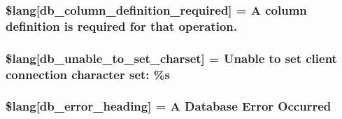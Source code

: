 \subsubsection[{\$lang}]{\setlength{\rightskip}{0pt plus 5cm}\$lang\mbox{[}\textquotesingle{}db\+\_\+column\+\_\+definition\+\_\+required\textquotesingle{}\mbox{]} = \textquotesingle{}A column definition is required {\bf for} that operation.\textquotesingle{}}\label{db__lang_8php_ad0ba270704ec81f8f89e486a18660354}
\hypertarget{db__lang_8php_ab22396948e25460833329cb8786ad831}{}
\subsubsection[{\$lang}]{\setlength{\rightskip}{0pt plus 5cm}\$lang\mbox{[}\textquotesingle{}db\+\_\+unable\+\_\+to\+\_\+set\+\_\+charset\textquotesingle{}\mbox{]} = \textquotesingle{}Unable to set client connection character set\+: \%s\textquotesingle{}}\label{db__lang_8php_ab22396948e25460833329cb8786ad831}
\hypertarget{db__lang_8php_a4be34cea2490b0d41689b65e52286658}{}
\subsubsection[{\$lang}]{\setlength{\rightskip}{0pt plus 5cm}\$lang\mbox{[}\textquotesingle{}db\+\_\+error\+\_\+heading\textquotesingle{}\mbox{]} = \textquotesingle{}A Database Error Occurred\textquotesingle{}}\label{db__lang_8php_a4be34cea2490b0d41689b65e52286658}
